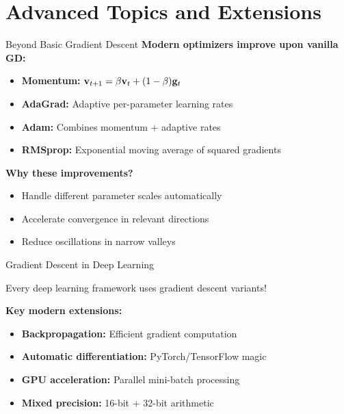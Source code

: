 \documentclass[usenames,dvipsnames]{beamer}
\begin{document}
  \section{Advanced Topics and Extensions}

  \begin{frame}{Beyond Basic Gradient Descent}
    \textbf{Modern optimizers improve upon vanilla GD:}
    
    \begin{itemize}[<+->]
        \item \textbf{Momentum:} $\mathbf{v}_{t+1} = \beta \mathbf{v}_t + (1-\beta)\mathbf{g}_t$
        \item \textbf{AdaGrad:} Adaptive per-parameter learning rates
        \item \textbf{Adam:} Combines momentum + adaptive rates  
        \item \textbf{RMSprop:} Exponential moving average of squared gradients
    \end{itemize}
    
    \pause
    \textbf{Why these improvements?}
    \begin{itemize}[<+->]
        \item Handle different parameter scales automatically
        \item Accelerate convergence in relevant directions
        \item Reduce oscillations in narrow valleys
    \end{itemize}
  \end{frame}

  \begin{frame}{Gradient Descent in Deep Learning}
    \begin{keypointsbox}{}
    Every deep learning framework uses gradient descent variants!
    \end{keypointsbox}
    
    \pause
    \textbf{Key modern extensions:}
    \begin{itemize}[<+->]
        \item \textbf{Backpropagation:} Efficient gradient computation
        \item \textbf{Automatic differentiation:} PyTorch/TensorFlow magic
        \item \textbf{GPU acceleration:} Parallel mini-batch processing
        \item \textbf{Mixed precision:} 16-bit + 32-bit arithmetic
    \end{itemize}
  \end{frame}
\end{document}
